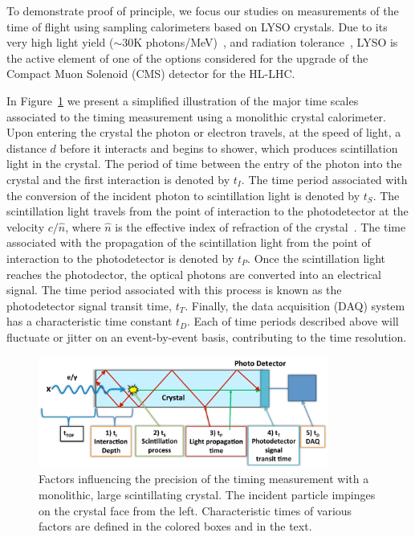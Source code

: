 \documentclass[12pt]{article}
\begin{document}
To demonstrate proof of principle, we focus our studies on measurements of the
time of flight using sampling calorimeters based on LYSO crystals. Due to its
very high light yield ($\sim 30$K photons/MeV)~\cite{LYSOProperties}, and
radiation tolerance~\cite{5402126, 4291695, 5402125, Dissertori:2013rma}, LYSO
is the active element of one of the options considered for the upgrade of the
Compact Muon Solenoid (CMS) detector for the HL-LHC. 

In Figure~\ref{fig:ScintillatorTiming} we present a simplified illustration of
the major time scales associated to the timing measurement using a monolithic
crystal calorimeter. Upon entering the crystal the photon or electron travels,
at the speed of light, a distance $d$ before it interacts and begins to shower,
which produces scintillation light in the crystal. The period of time between
the entry of the photon into the crystal and the first interaction is denoted by
$t_I$. The time period associated with the conversion of the incident photon to
scintillation light is denoted by $t_S$. The scintillation light travels from
the point of interaction to the photodetector at the velocity $c/\hat{n}$, where
$\hat{n}$ is the effective index of refraction of the crystal~\cite{Moses}. The
time associated with the propagation of the scintillation light from the point
of interaction to the photodetector is denoted by $t_P$. Once the scintillation
light reaches the photodector, the optical photons are converted into an
electrical signal. The time period associated with this process is known as the
photodetector signal transit time, $t_T$. Finally, the data acquisition (DAQ)
system has a characteristic time constant $t_D$. Each of time periods described
above will fluctuate or jitter on an event-by-event basis, contributing to the
time resolution.


\begin{figure}[h] \centering
\includegraphics[width=0.85\textwidth]{figs/ScintillatorTiming_v2}
\caption{Factors influencing the precision of the timing measurement with a
monolithic, large scintillating crystal. The incident particle impinges on the
crystal face from the left. Characteristic times of various factors are defined
in the colored boxes and in the text.}
\label{fig:ScintillatorTiming}
\end{figure}
\end{document}
